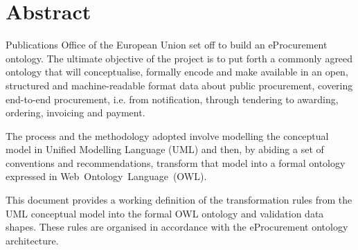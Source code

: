 \section*{Abstract}

	Publications Office of the European Union set off to build an eProcurement ontology. The ultimate objective of the project is to put forth a commonly agreed ontology that will conceptualise, formally encode and make available in an open, structured and machine-readable format data about public procurement, covering end-to-end procurement, i.e. from notification, through tendering to awarding, ordering, invoicing and payment.
	
	The process and the methodology adopted involve modelling the conceptual model in Unified Modelling Language (UML) and then, by abiding a set of conventions and recommendations, transform that model into a formal ontology expressed in \mbox{Web Ontology Language (OWL)}. 
	
	This document provides a working definition of the transformation rules from the UML conceptual model into the formal OWL ontology and validation data shapes. These rules are organised in accordance with the eProcurement ontology \mbox{architecture}.